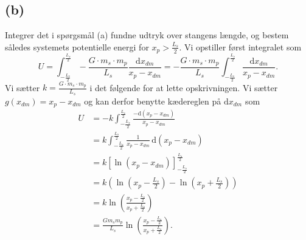 \documentclass[12pt]{article}
\theoremstyle{definition}
\begin{document}
\subsection*{(b)}
Integrer det i spørgsmål (a) fundne udtryk over stangens længde, og bestem således systemets potentielle energi for $x_p > \frac{L_s}{2}$.
\bigbreak
Vi opstiller først integralet som
\[ 
U = \int_{-\frac{L_s}{2}}^{\frac{L_s}{2}} -\frac{G \cdot m_s \cdot m_p}{L_s} \frac{\mathrm{d}x_{dm}}{x_p - x_{dm}} = -\frac{G \cdot m_s \cdot m_p}{L_s} \int_{- \frac{L_s}{2}}^{\frac{L_s}{2}} \frac{\mathrm{d}x_{dm}}{x_p - x_{dm}}
.\]
Vi sætter $k = \frac{G \cdot m_s \cdot m_p}{L_s}$ i det følgende for at lette opskrivningen. Vi sætter $g(x_{dm}) = x_p - x_{dm}$ og kan derfor benytte kædereglen på $\mathrm{d}x_{dm}$ som
\begin{align*}
  U &= -k \int_{-\frac{L_s}{2}}^{\frac{L_s}{2}} \frac{- \mathrm{d}(x_p - x_{dm})}{x_p - x_{dm}} \\
  &= k \int_{- \frac{L_s}{2}}^{\frac{L_s}{2}} \frac{1}{x_p - x_{dm}} \, \mathrm{d}(x_p - x_{dm}) \\
  &= k \left[ \ln(x_p - x_{dm}) \right]_{- \frac{L_s}{2}}^{\frac{L_s}{2}} \\
  &= k \left( \ln (x_p - \frac{L_s}{2}) - \ln(x_p + \frac{L_s}{2}) \right) \\
  &= k \ln \left( \frac{x_p - \frac{L_s}{2}}{x_p + \frac{L_s}{2}} \right) \\
  &= \frac{G m_s m_p}{L_s} \ln \left( \frac{x_p - \frac{L_s}{2}}{x_p + \frac{L_s}{2}} \right)
.\end{align*}
\end{document}
